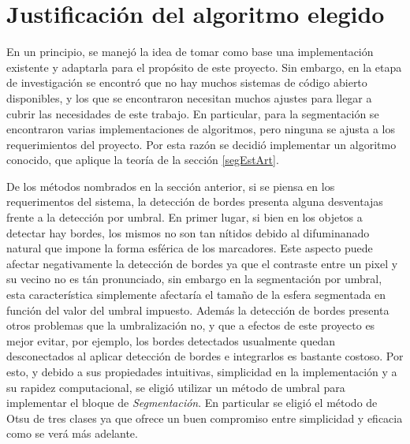 

\section{Justificación del algoritmo elegido}

En un principio, se manejó la idea de tomar como base una implementación existente y adaptarla para el propósito de este proyecto. Sin embargo, en la etapa de investigación se encontró que no hay muchos sistemas de código abierto disponibles, y los que se encontraron necesitan muchos ajustes para llegar a cubrir las necesidades de este trabajo. En particular, para la segmentación se encontraron varias implementaciones de algoritmos, pero ninguna se ajusta a los requerimientos del proyecto. Por esta razón se decidió implementar un algoritmo conocido, que aplique la teoría de la sección \ref{segEstArt}.

De los métodos nombrados en la sección anterior, si se piensa en los requerimentos del sistema, la detección de bordes presenta alguna desventajas frente a la detección por umbral. En primer lugar, si bien en los objetos a detectar hay bordes, los mismos no son tan nítidos debido al difuminanado natural que impone la forma esférica de los marcadores. Este aspecto puede afectar negativamente la detección de bordes ya que el contraste entre un pixel y su vecino no es tán pronunciado, sin embargo en la segmentación por umbral, esta característica simplemente afectaría el tamaño de la esfera segmentada en función del valor del umbral impuesto. Además la detección de bordes presenta otros problemas que la umbralización no, y que a efectos de este proyecto es mejor evitar, por ejemplo, los bordes detectados usualmente quedan desconectados al aplicar detección de bordes e integrarlos es bastante costoso. Por esto, y debido a sus propiedades intuitivas, simplicidad en la implementación y a su rapidez computacional, se eligió utilizar un método de umbral para implementar el bloque de \emph{Segmentación}. En particular se eligió el método de Otsu \cite{otsu} de tres clases ya que ofrece un buen compromiso entre simplicidad y eficacia como se verá más adelante. 

